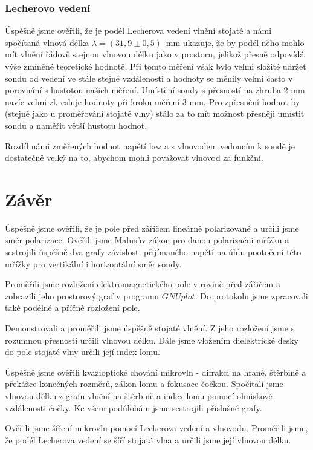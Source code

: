 \documentclass[english]{article}
\begin{document}
			\subsubsection{Lecherovo vedení}
					Úspěšně jsme ověřili, že je podél Lecherova vedení vlnění stojaté a námi spočítaná vlnová délka $\lambda=(31,9\pm0,5)$~mm ukazuje, že by podél něho mohlo mít vlnění řádově stejnou vlnovou délku jako v prostoru, jelikož přesně odpovídá výše zmíněné teoretické hodnotě. Při tomto měření však bylo velmi složité udržet sondu od vedení ve stále stejné vzdálenosti a hodnoty se měnily velmi často v porovnání s hustotou našich měření. Umístění sondy s přesností na zhruba 2 mm navíc velmi zkresluje hodnoty při kroku měření 3 mm. Pro zpřesnění hodnot by (stejně jako u proměřování stojaté vlny) stálo za to mít možnost přesněji umístit sondu a naměřit větší hustotu hodnot.

					Rozdíl námi změřených hodnot napětí bez a s vlnovodem vedoucím k sondě je dostatečně velký na to, abychom mohli považovat vlnovod za funkční.
					
\section{Závěr}
		Úspěšně jsme ověřili, že je pole před zářičem lineárně polarizované a určili jsme směr polarizace. Ověřili jsme Malusův zákon pro danou polarizační mřížku a sestrojili úspěšně dva grafy závislosti přijímaného napětí na úhlu pootočení této mřížky pro vertikální i horizontální směr sondy. 
		
		Proměřili jsme rozložení elektromagnetického pole v rovině před zářičem a zobrazili jeho prostorový graf v programu $GNUplot$. Do protokolu jsme zpracovali také podélné a příčné rozložení pole.
		
		Demonstrovali a proměřili jsme úspěšně stojaté vlnění. Z jeho rozložení jsme s rozumnou přesností určili vlnovou délku. Dále jsme vložením dielektrické desky do pole stojaté vlny určili její index lomu. 
		
		Úspěšně jsme ověřili kvazioptické chování mikrovln - difrakci na hraně, štěrbině a překážce konečných rozměrů, zákon lomu a fokusace čočkou. Spočítali jsme vlnovou délku z grafu vlnění na štěrbině a index lomu pomocí ohniskové vzdálenosti čočky. Ke všem podúlohám jsme sestrojili příslušné grafy.
		
		Ověřili jsme šíření mikrovln pomocí Lecherova vedení a vlnovodu. Proměřili jsme, že podél Lecherova vedení se šíří stojatá vlna a určili jsme její vlnovou délku.
	
\end{document}
